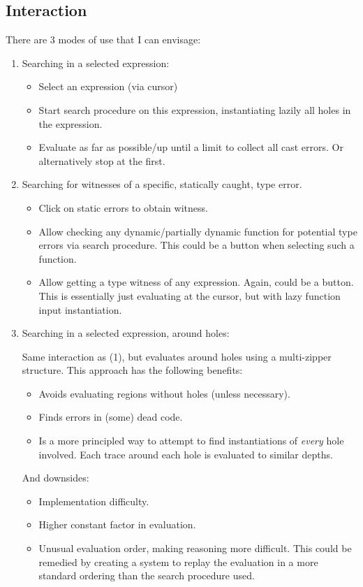\subsection{Interaction}
There are 3 modes of use that I can envisage:
\begin{enumerate}
\item Searching in a selected expression: \begin{itemize}
\item Select an expression (via cursor)
\item Start search procedure on this expression, instantiating lazily all holes in the expression.
\item Evaluate as far as possible/up until a limit to collect all cast errors. Or alternatively stop at the first.
\end{itemize}
\item Searching for witnesses of a specific, statically caught, type error.
\begin{itemize}
\item Click on static errors to obtain witness.
\item Allow checking any dynamic/partially dynamic function for potential type errors via search procedure. This could be a button when selecting such a function.
\item Allow getting a type witness of any expression. Again, could be a button. This is essentially just evaluating at the cursor, but with lazy function input instantiation.
\end{itemize}
\item Searching in a selected expression, around holes:\par  Same interaction as (1), but evaluates around holes using a multi-zipper structure. This approach has the following benefits:
\begin{itemize}
\item Avoids evaluating regions without holes (unless necessary).
\item Finds errors in (some) dead code.
\item Is a more principled way to attempt to find instantiations of \textit{every} hole involved. Each trace around each hole is evaluated to similar depths.
\end{itemize}
And downsides:
\begin{itemize}
\item Implementation difficulty.
\item Higher constant factor in evaluation.
\item Unusual evaluation order, making reasoning more difficult. This could be remedied by creating a system to replay the evaluation in a more standard ordering than the search procedure used.
\end{itemize}

\end{enumerate}

